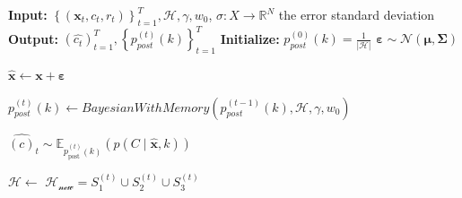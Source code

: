 \begin{algorithm}[htp]
\caption{$PM_0H_0$ Model as a Random Variable-valued Function}\label{alg:1}
\begin{algorithmic}[1]
\Statex \textbf{Input:} $\left\{(\mathbf x_t,c_t,r_t)\right\}_{t=1}^{T},\mathcal{H},\gamma,w_0$, $\sigma:X\rightarrow \mathbb{R}^N$ the error standard deviation
\Statex \textbf{Output:} ${(\hat{c_t})_{t=1}^T}, \left\{p_{post}^{(t)}(k)\right\}_{t=1}^T$
\Statex \textbf{Initialize:} $p_{post}^{(0)}(k) = \frac{1}{\left |\mathcal{H} \right |}$
    \State $\boldsymbol{\varepsilon} \sim \mathcal{N}(\boldsymbol{\mu}, \boldsymbol{\Sigma})$\rule{0pt}{13pt}
    \State $\hat{\mathbf x} \gets \mathbf x + \boldsymbol\varepsilon$\rule{0pt}{13pt}
    \State $p_{post}^{(t)}(k)\gets BayesianWithMemory(p_{post}^{(t-1)}(k),\mathcal{H},\gamma,w_0)$\rule{0pt}{13pt}
    \State $\hat{(c)}_{t} \sim \mathbb{E}_{p_{\text{post}}^{(t)}(k)} \left( p(C \mid \hat{\mathbf x}, k) \right)$\rule{0pt}{13pt}
    \State $\mathcal{H} \gets$ $\mathcal{H_{\text{new}}}=S_1^{(t)}\cup S_2^{(t)}\cup S_3^{(t)}$\rule{0pt}{13pt}
\EndFor
\end{algorithmic}
\end{algorithm}



